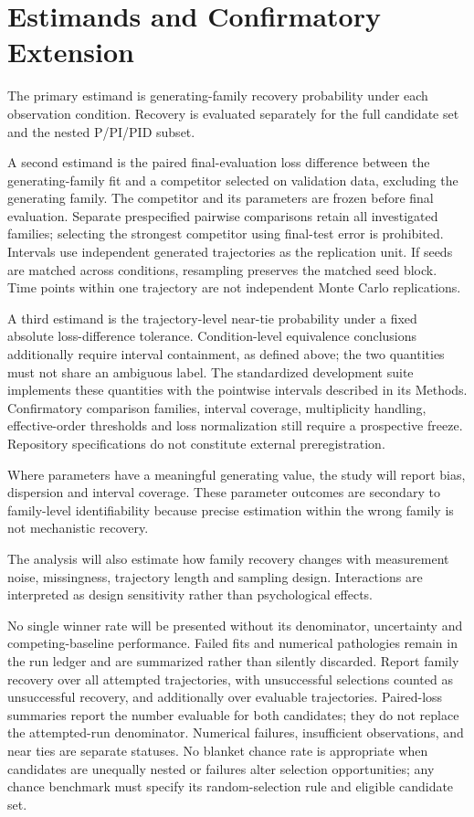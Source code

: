\section{Estimands and Confirmatory Extension}

The primary estimand is generating-family recovery probability under each observation condition. Recovery is evaluated separately for the full candidate set and the nested P/PI/PID subset.

A second estimand is the paired final-evaluation loss difference between the generating-family fit and a competitor selected on validation data, excluding the generating family. The competitor and its parameters are frozen before final evaluation. Separate prespecified pairwise comparisons retain all investigated families; selecting the strongest competitor using final-test error is prohibited. Intervals use independent generated trajectories as the replication unit. If seeds are matched across conditions, resampling preserves the matched seed block. Time points within one trajectory are not independent Monte Carlo replications.

A third estimand is the trajectory-level near-tie probability under a fixed absolute loss-difference tolerance. Condition-level equivalence conclusions additionally require interval containment, as defined above; the two quantities must not share an ambiguous label. The standardized development suite implements these quantities with the pointwise intervals described in its Methods. Confirmatory comparison families, interval coverage, multiplicity handling, effective-order thresholds and loss normalization still require a prospective freeze. Repository specifications do not constitute external preregistration.

Where parameters have a meaningful generating value, the study will report bias, dispersion and interval coverage. These parameter outcomes are secondary to family-level identifiability because precise estimation within the wrong family is not mechanistic recovery.

The analysis will also estimate how family recovery changes with measurement noise, missingness, trajectory length and sampling design. Interactions are interpreted as design sensitivity rather than psychological effects.

No single winner rate will be presented without its denominator, uncertainty and competing-baseline performance. Failed fits and numerical pathologies remain in the run ledger and are summarized rather than silently discarded. Report family recovery over all attempted trajectories, with unsuccessful selections counted as unsuccessful recovery, and additionally over evaluable trajectories. Paired-loss summaries report the number evaluable for both candidates; they do not replace the attempted-run denominator. Numerical failures, insufficient observations, and near ties are separate statuses. No blanket chance rate is appropriate when candidates are unequally nested or failures alter selection opportunities; any chance benchmark must specify its random-selection rule and eligible candidate set.




